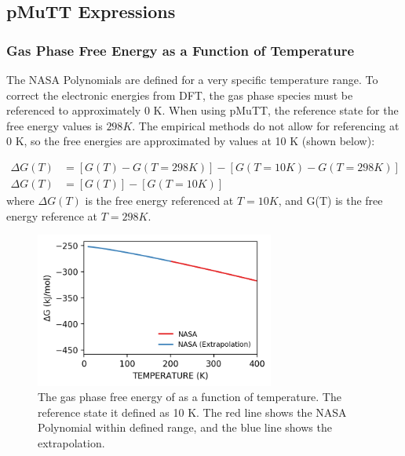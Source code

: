\documentclass[12pt]{article}
\begin{document}
\newpage
\subsection{pMuTT Expressions}

\subsubsection{Gas Phase Free Energy as a Function of Temperature}
The NASA Polynomials are defined for a very specific temperature range. To correct the electronic energies from DFT, the gas phase species must be referenced to approximately 0 K. When using pMuTT, the reference state for the free energy values is $298 K$. The empirical methods do not allow for referencing at 0 K, so the free energies are approximated by values at 10 K (shown below):

\begin{equation}
    \begin{split}
        \Delta G(T) &= [G(T) - G(T=298 K)] - [G(T=10 K) - G(T=298 K)] \\
        \Delta G(T) &= [G(T)] - [G(T=10 K)] 
    \end{split}
\end{equation} 
where $\Delta G(T)$ is the free energy referenced at $T = 10 K$, and G(T) is the free energy reference at $T = 298 K$. 

\begin{figure}[H]
    \centering
    \includegraphics[width=0.70\textwidth]{zi-images/00-General-Graphics/2021-figure-H2-pMuTT.png}
    \caption{The gas phase free energy of  as a function of temperature. The reference state it defined as 10 K. The red line shows the NASA Polynomial within defined range, and the blue line shows the extrapolation.}
    \label{fig:h2-pmutt-expression}
\end{figure}
\end{document}
